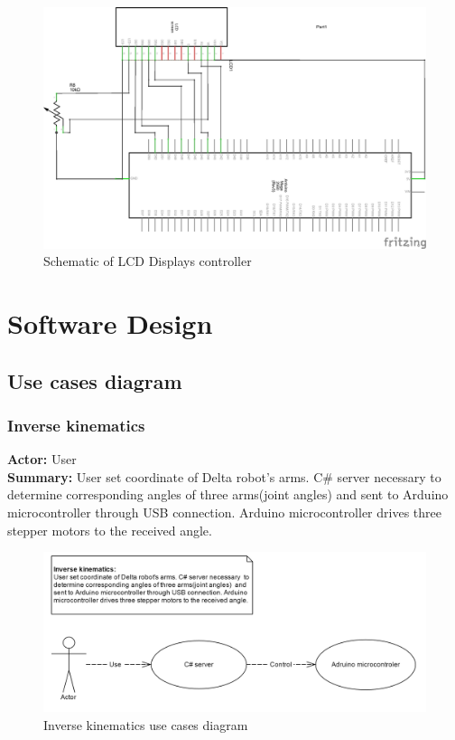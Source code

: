 \begin{figure}[H]
	\centering
	\includegraphics[width=\maxwidth{15cm}, keepaspectratio]{Chapters/Fig/Deltarobot_LCD_16x2_schem.png}
	\caption{Schematic of LCD Displays controller}
	\label{fig:Deltarobot_LCD_16x2_schem}
\end{figure}
\section{Software Design}

\subsection{Use cases diagram}
\subsubsection{Inverse kinematics}
\textbf{Actor:} User \\
\textbf{Summary:} User set coordinate of Delta robot's arms. C\# server necessary  to determine corresponding angles of three arms(joint angles)  and sent to Arduino microcontroller through USB connection. Arduino microcontroller drives three stepper motors to the received angle.
\begin{figure}[H]
	\centering
	\includegraphics[width=\maxwidth{15cm}, keepaspectratio]{Chapters/Fig/usecase_inverse_kinematics.png}
	\caption{Inverse kinematics use cases diagram}
	\label{fig:usecase_inverse_kinematics}
\end{figure}

